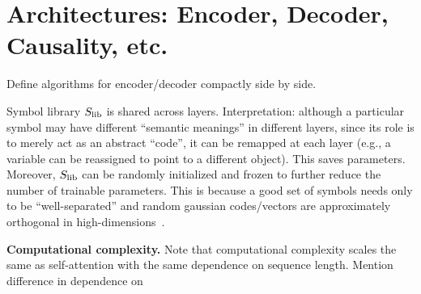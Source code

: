 
\section{Architectures: Encoder, Decoder, Causality, etc.}

Define algorithms for encoder/decoder compactly side by side.

Symbol library $S_\mathrm{lib}$ is shared across layers. Interpretation: although a particular symbol may have different ``semantic meanings'' in different layers, since its role is to merely act as an abstract ``code'', it can be remapped at each layer (e.g., a variable can be reassigned to point to a different object). This saves parameters. Moreover, $S_\mathrm{lib}$ can be randomly initialized and frozen to further reduce the number of trainable parameters. This is because a good set of symbols needs only to be ``well-separated'' and random gaussian codes/vectors are approximately orthogonal in high-dimensions~\citep{...}.

\textbf{Computational complexity.} Note that computational complexity scales the same as self-attention with the same dependence on sequence length. Mention difference in dependence on 

